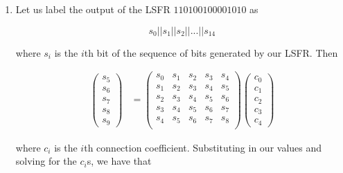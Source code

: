 \begin{enumerate}

\item Let us label the output of the LSFR $110100100001010$ as

\[s_0 || s_1 || s_2 || ... || s_{14} \]

where $s_i$ is the $i$th bit of the sequence of bits generated by our LSFR. Then

\begin{align*}
\begin{pmatrix}
s_5 \\ s_6 \\ s_7 \\ s_8 \\ s_9 
\end{pmatrix}
&= 
\begin{pmatrix}
s_0 & s_1 & s_2 & s_3 & s_4 \\
s_1 & s_2 & s_3 & s_4 & s_5 \\
s_2 & s_3 & s_4 & s_5 & s_6 \\
s_3 & s_4 & s_5 & s_6 & s_7 \\
s_4 & s_5 & s_6 & s_7 & s_8 \\
\end{pmatrix} 
\begin{pmatrix}
c_0 \\ c_1 \\ c_2 \\ c_3 \\ c_4
\end{pmatrix} 
\end{align*}

where $c_i$ is the $i$th connection coefficient. Substituting in our values and
solving for the $c_i$s, we have that


\end{enumerate}
